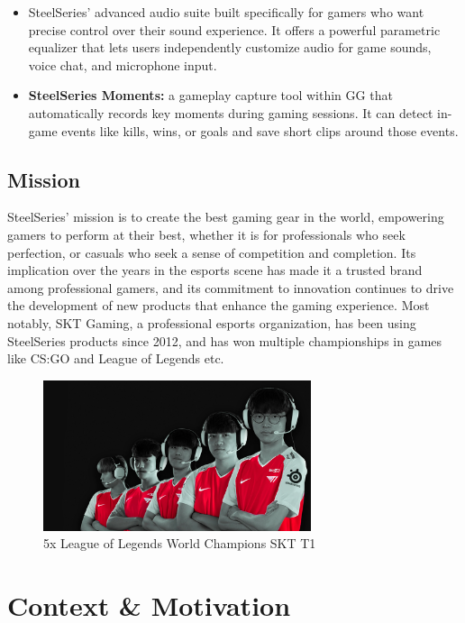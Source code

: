 \begin{itemize}
\begin{itemize}
        \item SteelSeries' advanced audio suite built specifically for gamers who want precise control over their sound experience. It offers a powerful parametric equalizer that lets users independently customize audio for game sounds, voice chat, and microphone input.
        \item \textbf{SteelSeries Moments:} a gameplay capture tool within GG that automatically records key moments during gaming sessions. It can detect in-game events like kills, wins, or goals and save short clips around those events.
        \end{itemize} 
\end{itemize}

\subsection{Mission}
SteelSeries' mission is to create the best gaming gear in the world, empowering gamers to perform at their best, whether it is for professionals who seek perfection, or casuals who seek a sense of competition and completion. Its implication over the years in the esports scene has made it a trusted brand among professional gamers, and its commitment to innovation continues to drive the development of new products that enhance the gaming experience. Most notably, SKT Gaming, a professional esports organization, has been using SteelSeries products since 2012, and has won multiple championships in games like CS:GO and League of Legends etc.
\begin{figure}[H]
    \centering
    \includegraphics[width=0.7\textwidth]{ressources/sktt1.png}
    \caption{5x League of Legends World Champions SKT T1}
    \label{fig:5x League of Legends World Champions SKT T1}
\end{figure}
\section{Context \& Motivation}
